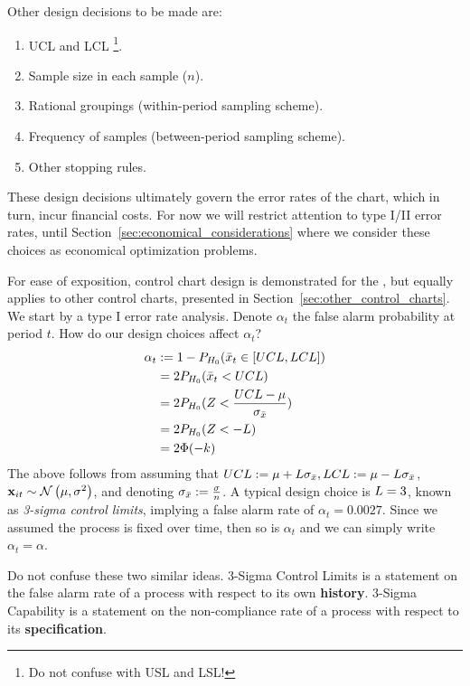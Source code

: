 Other design decisions to be made are:
\begin{enumerate}
\item UCL and LCL \footnote{Do not confuse with USL and LSL!}.
\item Sample size in each sample ($n$).
\item Rational groupings (within-period sampling scheme).
\item Frequency of samples (between-period sampling scheme). 
\item Other stopping rules.
\end{enumerate}
These design decisions ultimately govern the error rates of the chart, which in turn, incur financial costs. 
For now we will restrict attention to type I/II error rates, until Section~\ref{sec:economical_considerations} where we consider these choices as economical optimization problems.

For ease of exposition, control chart design is demonstrated for the \barxChart, but equally applies to other control charts, presented in Section~\ref{sec:other_control_charts}.
We start by a type I error rate analysis. 
Denote $\alpha_t$ the false alarm probability at period $t$.
How do our design choices affect $\alpha_t$?
\begin{align}
	\alpha_t &:= 1-P_{H_0}(\bar{x}_t \in [UCL,LCL]) \\
	&= 2 P_{H_0}(\bar{x}_t<UCL) \\
	&= 2 P_{H_0}(Z<\frac{UCL-\mu}{\sigma_{\bar{x}}}) \\
	&= 2 P_{H_0}(Z < -L) \\
	&= 2 \Phi(-k)
\end{align}
The above follows from assuming that $UCL:=\mu + L \sigma_{\bar{x}}, LCL:= \mu - L \sigma_{\bar{x}}$, $\mathbf{x}_{it}\sim \mathcal{N}\left(\mu,\sigma^2\right)$, and denoting $\sigma_{\bar{x}}:= \frac{\sigma}{n}$.
A typical design choice is $L=3$, known as \emph{3-sigma control limits}, implying a false alarm rate of $\alpha_t=0.0027$.
Since we assumed the process is fixed over time, then so is $\alpha_t$ and we can simply write $\alpha_t=\alpha$.

\begin{remark}
Do not confuse these two similar ideas.
3-Sigma Control Limits is a statement on the false alarm rate of a process with respect to its own \textbf{history}.
3-Sigma Capability is a statement on the non-compliance rate of a process with respect to its \textbf{specification}.
\end{remark}


